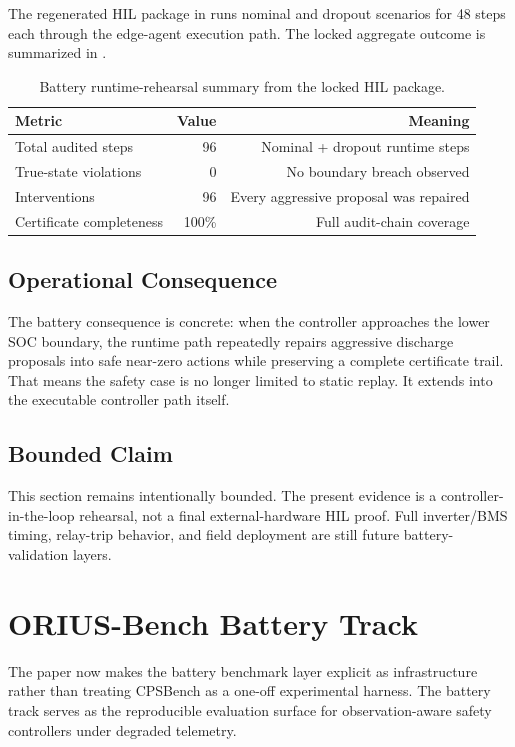 The regenerated HIL package in  runs nominal and dropout
scenarios for 48 steps each through the edge-agent execution path.  The locked
aggregate outcome is summarized in .

\begin{table}[htbp]
\centering\small
\caption{Battery runtime-rehearsal summary from the locked HIL package.}
\label{tab:hil_runtime_summary}
\begin{tabular}{lrr}
\toprule
Metric & Value & Meaning \\
\midrule
Total audited steps & 96 & Nominal + dropout runtime steps \\
True-state violations & 0 & No boundary breach observed \\
Interventions & 96 & Every aggressive proposal was repaired \\
Certificate completeness & 100\% & Full audit-chain coverage \\
\bottomrule
\end{tabular}
\end{table}

\subsection{Operational Consequence}

The battery consequence is concrete: when the controller approaches the lower
SOC boundary, the runtime path repeatedly repairs aggressive discharge
proposals into safe near-zero actions while preserving a complete certificate
trail.  That means the safety case is no longer limited to static replay.  It
extends into the executable controller path itself.

\subsection{Bounded Claim}

This section remains intentionally bounded.  The present evidence is a
controller-in-the-loop rehearsal, not a final external-hardware HIL proof.
Full inverter/BMS timing, relay-trip behavior, and field deployment are still
future battery-validation layers.

\section{ORIUS-Bench Battery Track}\label{sec:orius_bench}

The paper now makes the battery benchmark layer explicit as infrastructure
rather than treating CPSBench as a one-off experimental harness.  The battery
track serves as the reproducible evaluation surface for observation-aware
safety controllers under degraded telemetry.

